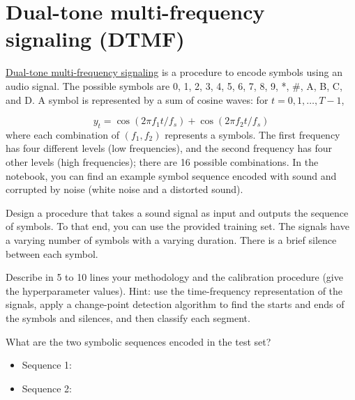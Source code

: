 \documentclass[11pt]{article}
\begin{document}
\newpage
\section{Dual-tone multi-frequency signaling (DTMF)}

\href{https://en.wikipedia.org/wiki/Dual-tone\_multi-frequency\_signaling}{Dual-tone multi-frequency signaling} is a procedure to encode symbols using an audio signal.
The possible symbols are 0, 1, 2, 3, 4, 5, 6, 7, 8, 9, *, \#, A, B, C, and D.
A symbol is represented by a sum of cosine waves: for $t=0,1,\dots, T-1$,

$$
y_t = \cos(2\pi f_1 t/f_s) + \cos(2\pi f_2 t/f_s)
$$
where each combination of $(f_1, f_2)$ represents a symbols.
The first frequency has four different levels (low frequencies), and the second frequency has four other levels (high frequencies); there are 16 possible combinations.
In the notebook, you can find an example symbol sequence encoded with sound and corrupted by noise (white noise and a distorted sound).

\begin{exercise}
Design a procedure that takes a sound signal as input and outputs the sequence of symbols. 
To that end, you can use the provided training set.
The signals have a varying number of symbols with a varying duration. 
There is a brief silence between each symbol.

Describe in 5 to 10 lines your methodology and the calibration procedure (give the hyperparameter values). Hint: use the time-frequency representation of the signals, apply a change-point detection algorithm to find the starts and ends of the symbols and silences, and then classify each segment. 

\end{exercise}
\begin{solution}

\end{solution}

\begin{exercise}
What are the two symbolic sequences encoded in the test set?
\end{exercise}

\begin{solution}
    \begin{itemize}
        \item Sequence 1:
        \item Sequence 2:
    \end{itemize}
\end{solution}
\end{document}
